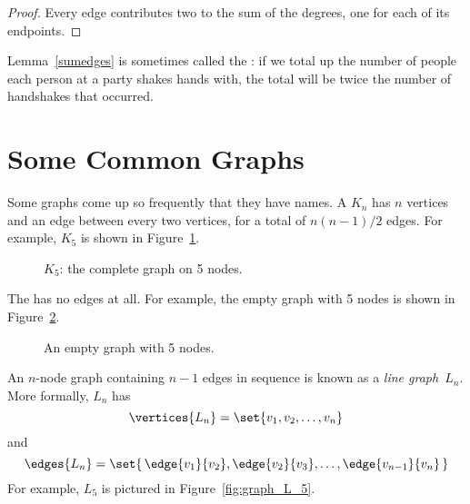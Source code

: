 \begin{proof}
Every edge contributes two to the sum of the degrees, one for each of its endpoints.
\end{proof}

Lemma~\ref{sumedges} is sometimes called the :
if we total up the number of people each person at a party shakes
hands with, the total will be twice the number of handshakes that
occurred.


\begin{problems}
\classproblems
{}

\examproblems
{}
\end{problems}

\section{Some Common Graphs}\label{sec:common_graphs}

Some graphs come up so frequently that they have names.  A
 $K_n$ has $n$ vertices and an edge between
every two vertices, for a total of $n(n-1)/2$ edges.  For example,
$K_5$ is shown in Figure~\ref{fig:K_5}.

\begin{figure}


\caption{$K_5$: the complete graph on 5 nodes.}
\label{fig:K_5}
\end{figure}

The  has no edges at all.  For example, the empty
graph with 5 nodes is shown in Figure~\ref{fig:graph_empty_5}.

\begin{figure}


\caption{An empty graph with 5 nodes.}
\label{fig:graph_empty_5}
\end{figure}

An $n$-node graph containing $n - 1$ edges in sequence is known as
a \emph{line graph}~$L_n$.  More formally, $L_n$ has
\begin{equation*}
    \vertices{L_n} = \set{ v_1, v_2, \dots, v_n }
\end{equation*}
and
\begin{equation*}
    \edges{L_n} = \set{\, \edge{v_1}{v_2}, \edge{v_2}{v_3}, \dots,
    \edge{v_{n-1}}{v_n} \, }
\end{equation*}
For example, $L_5$ is pictured in Figure~\ref{fig:graph_L_5}.

